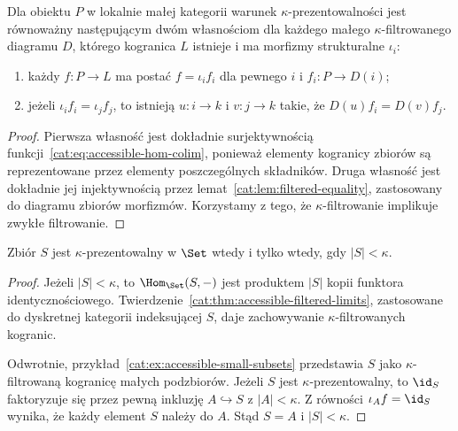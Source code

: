\begin{stwierdzenie}\label{cat:prop:accessible-presentable-factor}
Dla obiektu $P$ w lokalnie małej kategorii warunek $\kappa$-prezentowalności jest równoważny następującym dwóm własnościom dla każdego małego $\kappa$-filtrowanego diagramu $D$, którego kogranica $L$ istnieje i ma morfizmy strukturalne $\iota_i$:
\begin{enumerate}
 \item każdy $f:P\to L$ ma postać $f=\iota_i f_i$ dla pewnego $i$ i $f_i:P\to D(i)$;
 \item jeżeli $\iota_i f_i=\iota_j f_j$, to istnieją $u:i\to k$ i $v:j\to k$ takie, że $D(u)f_i=D(v)f_j$.
\end{enumerate}
\end{stwierdzenie}
\begin{proof}
Pierwsza własność jest dokładnie surjektywnością funkcji~\eqref{cat:eq:accessible-hom-colim}, ponieważ elementy kogranicy zbiorów są reprezentowane przez elementy poszczególnych składników. Druga własność jest dokładnie jej injektywnością przez lemat~\ref{cat:lem:filtered-equality}, zastosowany do diagramu zbiorów morfizmów. Korzystamy z tego, że $\kappa$-filtrowanie implikuje zwykłe filtrowanie.
\end{proof}

\begin{twierdzenie}\label{cat:thm:accessible-set-presentability}
Zbiór $S$ jest $\kappa$-prezentowalny w $\Set$ wtedy i tylko wtedy, gdy $|S|<\kappa$.
\end{twierdzenie}
\begin{proof}
Jeżeli $|S|<\kappa$, to $\Hom_{\Set}(S,-)$ jest produktem $|S|$ kopii funktora identycznościowego. Twierdzenie~\ref{cat:thm:accessible-filtered-limits}, zastosowane do dyskretnej kategorii indeksującej $S$, daje zachowywanie $\kappa$-filtrowanych kogranic.

Odwrotnie, przykład~\ref{cat:ex:accessible-small-subsets} przedstawia $S$ jako $\kappa$-filtrowaną kogranicę małych podzbiorów. Jeżeli $S$ jest $\kappa$-prezentowalny, to $\id_S$ faktoryzuje się przez pewną inkluzję $A\hookrightarrow S$ z $|A|<\kappa$. Z równości $\iota_A f=\id_S$ wynika, że każdy element $S$ należy do $A$. Stąd $S=A$ i $|S|<\kappa$.
\end{proof}

